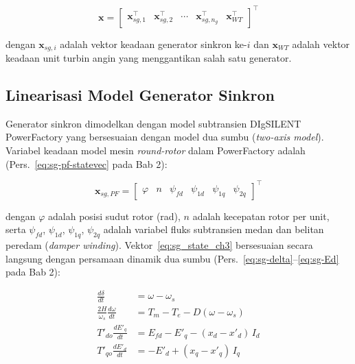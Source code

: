 \begin{equation}
    \mathbf{x} =
    \begin{bmatrix}
        \mathbf{x}_{sg,1}^\top & \mathbf{x}_{sg,2}^\top & \cdots &
        \mathbf{x}_{sg,n_g}^\top & \mathbf{x}_{WT}^\top
    \end{bmatrix}^\top
    \label{eq:state_full}
\end{equation}

dengan $\mathbf{x}_{sg,i}$ adalah vektor keadaan generator sinkron ke-$i$ dan
$\mathbf{x}_{WT}$ adalah vektor keadaan unit turbin angin yang menggantikan
salah satu generator.

\subsection{Linearisasi Model Generator Sinkron}

Generator sinkron dimodelkan dengan model subtransien DIgSILENT PowerFactory
yang bersesuaian dengan model dua sumbu (\textit{two-axis model}). Variabel
keadaan model mesin \textit{round-rotor} dalam PowerFactory adalah
(Pers.~\ref{eq:sg-pf-statevec} pada Bab 2):

\begin{equation}
    \mathbf{x}_{sg,PF} =
    \begin{bmatrix}\varphi & n & \psi_{fd} & \psi_{1d} & \psi_{1q} & \psi_{2q}\end{bmatrix}^\top
    \label{eq:sg_state_ch3}
\end{equation}

dengan $\varphi$ adalah posisi sudut rotor (rad), $n$ adalah kecepatan rotor
per unit, serta $\psi_{fd}$, $\psi_{1d}$, $\psi_{1q}$, $\psi_{2q}$ adalah
variabel fluks subtransien medan dan belitan peredam (\textit{damper winding}).
Vektor~\eqref{eq:sg_state_ch3} bersesuaian secara langsung dengan persamaan
dinamik dua sumbu (Pers.~\ref{eq:sg-delta}--\ref{eq:sg-Ed} pada Bab 2):

\begin{align}
    \frac{d\delta}{dt} &= \omega - \omega_s
    \label{eq:sg_delta_ch3} \\[4pt]
    \frac{2H}{\omega_s}\frac{d\omega}{dt} &= T_m - T_e - D(\omega - \omega_s)
    \label{eq:sg_omega_ch3} \\[4pt]
    T'_{do}\frac{dE'_q}{dt} &= E_{fd} - E'_q - (x_d - x'_d)\,I_d
    \label{eq:sg_Eq_ch3} \\[4pt]
    T'_{qo}\frac{dE'_d}{dt} &= -E'_d + (x_q - x'_q)\,I_q
    \label{eq:sg_Ed_ch3}
\end{align}

